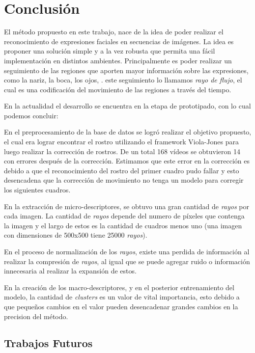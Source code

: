 \chapter[Conclusión]{Conclusión}
\label{ch:conclusion}

El método propuesto en este trabajo, nace de la idea de poder realizar el reconocimiento de expresiones faciales en secuencias de imágenes. La idea es proponer una solución simple y a la vez robusta que permita una fácil implementación en distintos ambientes. Principalmente es poder realizar un seguimiento de las regiones que aporten mayor información sobre las expresiones, como la nariz, la boca, los ojos, \etc. este seguimiento lo llamamos \textit{rayo de flujo}, el cual es una codificación del movimiento de las regiones a través del tiempo.

En la actualidad el desarrollo se encuentra en la etapa de prototipado, con lo cual podemos concluir:

En el preprocesamiento de la base de datos se logró realizar el objetivo propuesto, el cual era lograr encontrar el rostro utilizando el framework Viola-Jones para luego realizar la corrección de rostros. De un total 168 vídeos se obtuvieron 14 con errores después de la corrección. Estimamos que este error en la corrección es debido a que el reconocimiento del rostro del primer cuadro pudo fallar y esto desencadena que la corrección de movimiento no tenga un modelo para corregir los siguientes cuadros.

En la extracción de micro-descriptores, se obtuvo una gran cantidad de \textit{rayos} por cada imagen. La cantidad de \textit{rayos} depende del numero de píxeles que contenga la imagen y el largo de estos es la cantidad de cuadros menos uno (\eg una imagen con dimensiones de 500x500 tiene 25000 \textit{rayos}).

En el proceso de normalización de los \textit{rayos}, existe una perdida de información al realizar la compresión de \textit{rayos}, al igual que se puede agregar ruido o información innecesaria al realizar la expansión de estos.

En la creación de los macro-descriptores, y en el posterior entrenamiento del modelo, la cantidad de \textit{clusters} es un valor de vital importancia, esto debido a que pequeños cambios en el valor pueden desencadenar grandes cambios en la precision del método.

\section{Trabajos Futuros}


